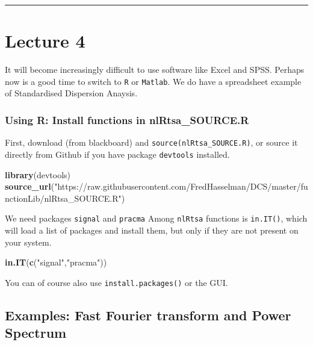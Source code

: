 \documentclass[]{book}
\newenvironment{Shaded}{\begin{snugshade}}{\end{snugshade}}
\newcommand{\KeywordTok}[1]{\textcolor[rgb]{0.13,0.29,0.53}{\textbf{{#1}}}}
\newcommand{\StringTok}[1]{\textcolor[rgb]{0.31,0.60,0.02}{{#1}}}
\newcommand{\NormalTok}[1]{{#1}}
\let\stdsection\section
\renewcommand\section{\newpage\stdsection}
\begin{document}
\begin{center}\rule{0.5\linewidth}{\linethickness}\end{center}

\hypertarget{lecture-4}{\chapter*{Lecture 4}\label{lecture-4}}

It will become increasingly difficult to use software like Excel and
SPSS. Perhaps now is a good time to switch to \texttt{R} or
\texttt{Matlab}. We do have a spreadsheet example of Standardised
Dispersion Anaysis.

\subsection*{Using R: Install functions in
nlRtsa\_SOURCE.R}\label{using-r-install-functions-in-nlrtsa_source.r}

First, download (from blackboard) and
\texttt{source(\textquotesingle{}nlRtsa\_SOURCE.R\textquotesingle{})},
or source it directly from Github if you have package \texttt{devtools}
installed.

\begin{Shaded}
\begin{Highlighting}[]
\KeywordTok{library}\NormalTok{(devtools)}
\KeywordTok{source_url}\NormalTok{(}\StringTok{"https://raw.githubusercontent.com/FredHasselman/DCS/master/functionLib/nlRtsa_SOURCE.R"}\NormalTok{)}
\end{Highlighting}
\end{Shaded}

We need packages \texttt{signal} and \texttt{pracma} Among
\texttt{nlRtsa} functions is \texttt{in.IT()}, which will load a list of
packages and install them, but only if they are not present on your
system.

\begin{Shaded}
\begin{Highlighting}[]
\KeywordTok{in.IT}\NormalTok{(}\KeywordTok{c}\NormalTok{(}\StringTok{"signal"}\NormalTok{,}\StringTok{"pracma"}\NormalTok{))}
\end{Highlighting}
\end{Shaded}

You can of course also use \texttt{install.packages()} or the GUI.

\section*{Examples: Fast Fourier transform and Power
Spectrum}\label{examples-fast-fourier-transform-and-power-spectrum}
\end{document}
